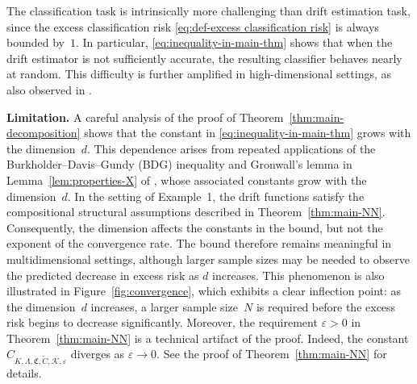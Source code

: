 \documentclass{article}
\theoremstyle{plain}
\theoremstyle{definition}
\theoremstyle{remark}
\begin{document}
The classification task is intrinsically more challenging than drift estimation task, since the excess classification risk \eqref{eq:def-excess classification risk} is always bounded by~$1$. In particular, \eqref{eq:inequality-in-main-thm} shows that when the drift estimator is not sufficiently accurate, the resulting classifier behaves nearly at random. This difficulty is further amplified in high-dimensional settings, as also observed in \citet[Section~7]{denis2025empirical}.


\textbf{Limitation.} 
A careful analysis of the proof of Theorem~\ref{thm:main-decomposition} shows that the constant in \eqref{eq:inequality-in-main-thm} grows with the dimension~$d$. This dependence arises from repeated applications of the Burkholder--Davis--Gundy (BDG) inequality and Gronwall's lemma in Lemma~\ref{lem:properties-X} of \citet[Lemma~7.4 and Proposition~7.6]{pages2018numerical}, whose associated constants grow with the dimension~$d$. In the setting of Example~1, the drift functions satisfy the compositional structural assumptions described in Theorem~\ref{thm:main-NN}. Consequently, the dimension affects the constants in the bound, but not the exponent of the convergence rate. The bound therefore remains meaningful in multidimensional settings, although larger sample sizes may be needed to observe the predicted decrease in excess risk as \(d\) increases. This phenomenon is also illustrated in Figure~\ref{fig:convergence}, which exhibits a clear inflection point: as the dimension~$d$ increases, a larger sample size~$N$ is required before the excess risk begins to decrease significantly. Moreover, the requirement $\varepsilon > 0$ in Theorem~\ref{thm:main-NN} is a technical artifact of the proof. Indeed, the constant $C_{K,\Lambda,\mathfrak{C},\widetilde{C},\mathcal{K},\varepsilon}$
diverges as $\varepsilon \to 0$. See the proof of Theorem~\ref{thm:main-NN} for details.

\end{document}
